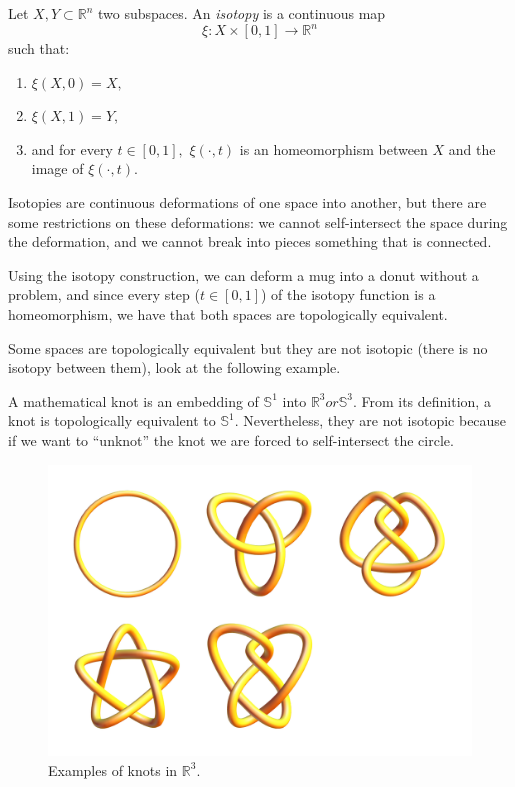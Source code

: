 \documentclass[
	fontsize=10pt, %
	twoside=false, %
	secnumdepth=1, %
]{kaobook}
\begin{document}
\begin{definition}
Let $X,Y\subset \mathbb{R}^n$ two subspaces. An \emph{isotopy} is a continuous map $$\xi: X\times [0,1] \to \mathbb{R}^n$$ such that: 
\begin{enumerate}
\item $\xi(X,0)=X,$
\item $\xi(X,1)=Y,$
\item and for every $t\in[0,1],$ $\xi(\cdot,t)$ is an homeomorphism between $X$ and the image of $\xi(\cdot,t).$ 
\end{enumerate}
\end{definition}

Isotopies are continuous deformations of one space into another, but there are some restrictions on these deformations: we cannot self-intersect the space during the deformation, and we cannot break into pieces something that is connected.

Using the isotopy construction, we can deform a mug into a donut without a problem, and since every step ($t\in [0,1]$) of the isotopy function is a homeomorphism, we have that both spaces are topologically equivalent. 

Some spaces are topologically equivalent but they are not isotopic (there is no isotopy between them), look at the following example.

\begin{example}
A mathematical knot is an embedding of $\mathbb{S}^1$ into $\mathbb{R}^3 or \mathbb{S}^3.$ From its definition, a knot is topologically equivalent to $\mathbb{S}^1.$ Nevertheless, they are not isotopic because if we want to ``unknot'' the knot we are forced to self-intersect the circle.

\begin{figure}[h]
\includegraphics[scale=0.5]{O_168.png}
\caption{Examples of knots in $\mathbb{R}^3.$}
\end{figure}
\end{example}
\end{document}
